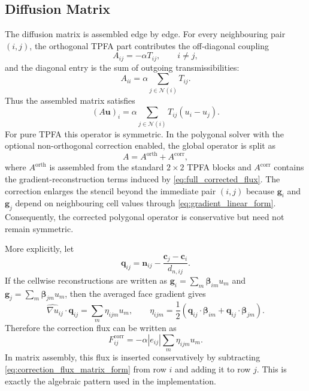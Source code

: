 \documentclass[11pt]{article}
\theoremstyle{plain}
\theoremstyle{definition}
\theoremstyle{remark}
\numberwithin{equation}{section}
\begin{document}
\subsection{Diffusion Matrix}
The diffusion matrix is assembled edge by edge. For every neighbouring pair $(i,j)$, the orthogonal TPFA part contributes the off-diagonal coupling
\begin{equation}
\label{eq:offdiag_entry}
A_{ij} = - \alpha T_{ij}, \qquad i \neq j,
\end{equation}
and the diagonal entry is the sum of outgoing transmissibilities:
\begin{equation}
\label{eq:diag_entry}
A_{ii} = \alpha \sum_{j \in \mathcal{N}(i)} T_{ij}.
\end{equation}
Thus the assembled matrix satisfies
\begin{equation}
\label{eq:row_sum_form}
(A \bm{u})_i = \alpha \sum_{j \in \mathcal{N}(i)} T_{ij}(u_i - u_j).
\end{equation}
For pure TPFA this operator is symmetric. In the polygonal solver with the optional non-orthogonal correction enabled, the global operator is split as
\begin{equation}
\label{eq:operator_split}
A = A^{\mathrm{orth}} + A^{\mathrm{corr}},
\end{equation}
where $A^{\mathrm{orth}}$ is assembled from the standard $2 \times 2$ TPFA blocks and $A^{\mathrm{corr}}$ contains the gradient-reconstruction terms induced by \cref{eq:full_corrected_flux}. The correction enlarges the stencil beyond the immediate pair $(i,j)$ because $\bm{g}_i$ and $\bm{g}_j$ depend on neighbouring cell values through \cref{eq:gradient_linear_form}. Consequently, the corrected polygonal operator is conservative but need not remain symmetric.

More explicitly, let
\begin{equation}
\label{eq:correction_direction}
\bm{q}_{ij}
=
\bm{n}_{ij} - \frac{\bm{c}_j - \bm{c}_i}{d_{n,ij}}.
\end{equation}
If the cellwise reconstructions are written as $\bm{g}_i = \sum_m \bm{\beta}_{im} u_m$ and $\bm{g}_j = \sum_m \bm{\beta}_{jm} u_m$, then the averaged face gradient gives
\begin{equation}
\widehat{\nabla u}_{ij} \cdot \bm{q}_{ij}
=
\sum_m \eta_{ijm} u_m,
\qquad
\eta_{ijm}
=
\frac{1}{2}\left(
\bm{q}_{ij} \cdot \bm{\beta}_{im}
+ \bm{q}_{ij} \cdot \bm{\beta}_{jm}
\right).
\end{equation}
Therefore the correction flux can be written as
\begin{equation}
\label{eq:correction_flux_matrix_form}
F_{ij}^{\mathrm{corr}}
=
- \alpha |e_{ij}| \sum_m \eta_{ijm} u_m.
\end{equation}
In matrix assembly, this flux is inserted conservatively by subtracting \cref{eq:correction_flux_matrix_form} from row $i$ and adding it to row $j$. This is exactly the algebraic pattern used in the implementation.
\end{document}
